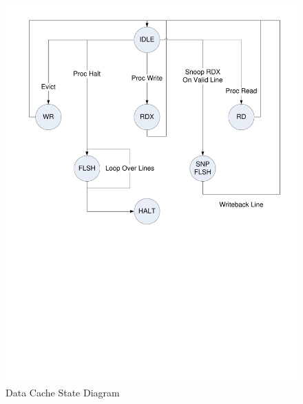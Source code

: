 \documentclass[12pt]{article}
\begin{document}
\begin{figure}
	\begin{center}
		\includegraphics[width=7in]{cache_fsm}
	\end{center}
	\caption{Data Cache State Diagram}
	\label{fig:cache_fsm}
\end{figure}



\newpage
\end{document}
